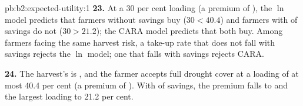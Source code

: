 \begin{solution}{pb:b2:expected-utility:1}
\textbf{23.} At a 30 per cent loading (a premium of ), the $\ln$ model predicts that farmers
without savings buy ($30 < 40.4$) and farmers with  of savings do not ($30 > 21.2$); the
CARA model predicts that both buy. Among farmers facing the same harvest risk, a take-up rate that does
not fall with savings rejects the $\ln$ model; one that falls with savings rejects CARA.

\textbf{24.} The harvest's  is , and the farmer accepts full drought cover at a
loading of at most 40.4 per cent (a premium of ). With  of savings, the premium
falls to  and the largest loading to 21.2 per cent.
\end{solution}
